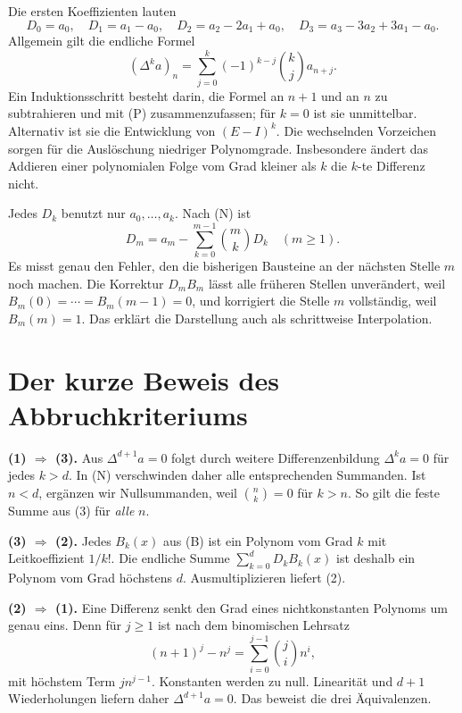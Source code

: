 Die ersten Koeffizienten lauten
\[
 D_0=a_0,\quad D_1=a_1-a_0,\quad
 D_2=a_2-2a_1+a_0,\quad D_3=a_3-3a_2+3a_1-a_0.
\]
Allgemein gilt die endliche Formel
\begin{equation}\tag{D}\label{newton:explicit}
 (\Delta^ka)_n=\sum_{j=0}^k(-1)^{k-j}\binom kj a_{n+j}.
\end{equation}
Ein Induktionsschritt besteht darin, die Formel an $n+1$ und an $n$
zu subtrahieren und mit (P) zusammenzufassen; für $k=0$ ist sie
unmittelbar. Alternativ ist sie die Entwicklung von $(E-I)^k$.
Die wechselnden Vorzeichen sorgen für die Auslöschung niedriger
Polynomgrade. Insbesondere ändert das Addieren einer polynomialen
Folge vom Grad kleiner als $k$ die $k$-te Differenz nicht.

Jedes $D_k$ benutzt nur $a_0,\ldots,a_k$. Nach (N) ist
\begin{equation}\tag{C}\label{newton:correction}
 D_m=a_m-\sum_{k=0}^{m-1}\binom mkD_k\quad(m\geq1).
\end{equation}
Es misst genau den Fehler, den die bisherigen Bausteine an der
nächsten Stelle $m$ noch machen. Die Korrektur $D_mB_m$ lässt alle
früheren Stellen unverändert, weil $B_m(0)=\cdots=B_m(m-1)=0$, und
korrigiert die Stelle $m$ vollständig, weil $B_m(m)=1$.
Das erklärt die Darstellung auch als schrittweise Interpolation.

\section{Der kurze Beweis des Abbruchkriteriums}

\textbf{(1) $\Rightarrow$ (3).}
Aus $\Delta^{d+1}a=0$ folgt durch weitere Differenzenbildung
$\Delta^ka=0$ für jedes $k>d$. In (N) verschwinden daher alle
entsprechenden Summanden. Ist $n<d$, ergänzen wir Nullsummanden,
weil $\binom nk=0$ für $k>n$. So gilt die feste Summe aus (3) für
\emph{alle} $n$.

\textbf{(3) $\Rightarrow$ (2).}
Jedes $B_k(x)$ aus (B) ist ein Polynom vom Grad $k$ mit Leitkoeffizient
$1/k!$. Die endliche Summe $\sum_{k=0}^d D_kB_k(x)$ ist deshalb ein
Polynom vom Grad höchstens $d$. Ausmultiplizieren liefert (2).

\textbf{(2) $\Rightarrow$ (1).}
Eine Differenz senkt den Grad eines nichtkonstanten Polynoms um genau
eins. Denn für $j\geq1$ ist nach dem binomischen Lehrsatz
\begin{equation}\tag{G}\label{newton:degree}
 (n+1)^j-n^j=\sum_{i=0}^{j-1}\binom ji n^i,
\end{equation}
mit höchstem Term $j n^{j-1}$. Konstanten werden zu null.
Linearität und $d+1$ Wiederholungen liefern daher $\Delta^{d+1}a=0$.
Das beweist die drei Äquivalenzen.

